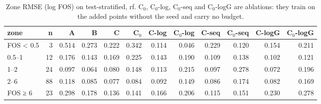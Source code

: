 \begin{table}[htbp]
\centering
\small
\setlength{\tabcolsep}{4pt}
\caption{Zone RMSE (log FOS) on test-stratified, rf. C$_0$, C$_0$-log, C$_0$-seq and C$_0$-logG are ablations: they train on the added points without the seed and carry no budget.}
\label{tab:test-stratified__fos-rmse:zones_log:rf}
\begin{tabular}{lrrrrrrrrrrr}
\toprule
zone & n & A & B & C & C$_0$ & C-log & C$_0$-log & C-seq & C$_0$-seq & C-logG & C$_0$-logG \\
\midrule
FOS < 0.5 & 3 & 0.514 & 0.273 & 0.222 & 0.342 & 0.114 & 0.046 & 0.229 & 0.120 & 0.154 & 0.211 \\
0.5–1 & 12 & 0.176 & 0.143 & 0.169 & 0.225 & 0.143 & 0.190 & 0.109 & 0.138 & 0.102 & 0.121 \\
1–2 & 24 & 0.097 & 0.064 & 0.080 & 0.148 & 0.113 & 0.215 & 0.097 & 0.278 & 0.072 & 0.196 \\
2–6 & 88 & 0.118 & 0.085 & 0.077 & 0.084 & 0.092 & 0.149 & 0.086 & 0.174 & 0.082 & 0.169 \\
FOS ≥ 6 & 23 & 0.298 & 0.178 & 0.136 & 0.141 & 0.166 & 0.206 & 0.115 & 0.151 & 0.230 & 0.278 \\
\bottomrule
\end{tabular}
\end{table}
